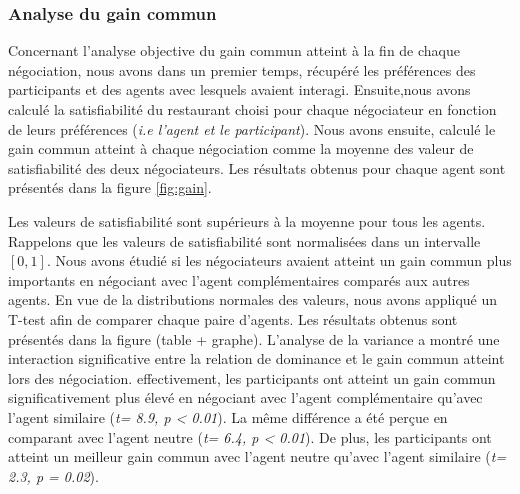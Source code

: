 		\subsubsection{Analyse du gain commun } Concernant l'analyse objective du gain commun atteint à la fin de chaque négociation, nous avons dans un premier temps, récupéré les préférences des participants et des agents avec lesquels avaient interagi. 
		Ensuite,nous avons calculé la satisfiabilité du restaurant choisi pour chaque négociateur en fonction de leurs préférences (\textit{i.e l'agent et le participant}). Nous avons ensuite, calculé le gain commun atteint à chaque négociation comme la moyenne des valeur de satisfiabilité des deux négociateurs.  Les résultats obtenus pour chaque agent sont présentés dans la figure \ref{fig:gain}. 
		
		Les valeurs de satisfiabilité sont supérieurs à la moyenne pour tous les agents. Rappelons que les valeurs de satisfiabilité sont normalisées dans un intervalle $[0, 1]$. Nous avons étudié si les négociateurs avaient atteint un gain commun plus importants en négociant avec l'agent complémentaires comparés aux autres agents. En vue de la distributions normales des valeurs, nous avons appliqué un T-test afin de comparer chaque paire d'agents. Les résultats obtenus sont présentés dans la figure (table + graphe). L'analyse de la variance a montré une interaction significative entre la relation de dominance et le gain commun atteint lors des négociation. effectivement, les participants ont atteint un gain commun significativement plus élevé en négociant avec l'agent complémentaire qu'avec l'agent similaire (\emph{t= 8.9, p < 0.01}). La même différence a été perçue en comparant avec l'agent neutre (\emph{t= 6.4, p < 0.01}).
		De plus, les participants ont atteint un meilleur gain commun avec l'agent neutre qu'avec l'agent similaire (\emph{t= 2.3, p = 0.02}).

